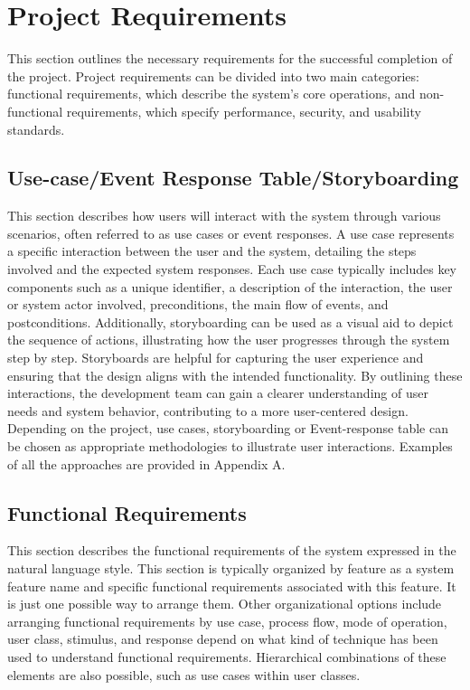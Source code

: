 \chapter{Project Requirements}
This section outlines the necessary requirements for the successful completion of the project. Project requirements can be divided into two main categories: functional requirements, which describe the system’s core operations, and non-functional requirements, which specify performance, security, and usability standards.
\section{Use-case/Event Response Table/Storyboarding}
This section describes how users will interact with the system through various scenarios, often referred to as use cases or event responses. A use case represents a specific interaction between the user and the system, detailing the steps involved and the expected system responses. Each use case typically includes key components such as a unique identifier, a description of the interaction, the user or system actor involved, preconditions, the main flow of events, and postconditions. Additionally, storyboarding can be used as a visual aid to depict the sequence of actions, illustrating how the user progresses through the system step by step. Storyboards are helpful for capturing the user experience and ensuring that the design aligns with the intended functionality. By outlining these interactions, the development team can gain a clearer understanding of user needs and system behavior, contributing to a more user-centered design. \\

Depending on the project, use cases, storyboarding or Event-response table can be chosen as appropriate methodologies to illustrate user interactions. Examples of all the approaches are provided in Appendix A.



\section{Functional Requirements}
This section describes the functional requirements of the system expressed in the natural language style. This section is typically organized by feature as a system feature name and specific functional requirements associated with this feature. It is just one possible way to arrange them. Other organizational options include arranging functional requirements by use case, process flow, mode of operation, user class, stimulus, and response depend on what kind of technique has been used to understand functional requirements. Hierarchical combinations of these elements are also possible, such as use cases within user classes.

